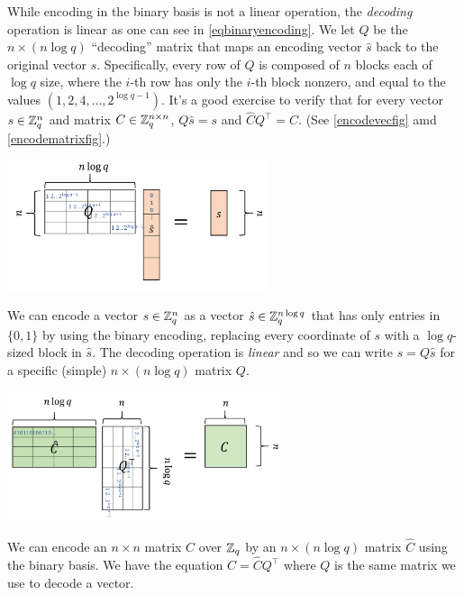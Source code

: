 While encoding in the binary basis is not a linear operation, the
\emph{decoding} operation is linear as one can see in
\eqref{eqbinaryencoding}. We let \(Q\) be the \(n \times (n\log q)\)
``decoding'' matrix that maps an encoding vector \(\hat{s}\) back to the
original vector \(s\). Specifically, every row of \(Q\) is composed of
\(n\) blocks each of \(\log q\) size, where the \(i\)-th row has only
the \(i\)-th block nonzero, and equal to the values
\((1,2,4,\ldots,2^{\log q-1})\). It's a good exercise to verify that for
every vector \(s\in {\mathbb{Z}}_q^n\) and matrix \(C\in {\mathbb{Z}}_q^{n\times n}\),
\(Q\hat{s}=s\) and \(\hat{C}Q^\top =C\). (See \cref{encodevecfig} amd
\cref{encodematrixfig}.)

\begin{marginfigure}
\centering
\includegraphics[width=\linewidth, height=1.5in, keepaspectratio]{../figure/encodevec.png}
\caption{We can encode a vector \(s\in {\mathbb{Z}}_q^n\) as a vector
\(\hat{s} \in {\mathbb{Z}}_q^{n\log q}\) that has only entries in \(\{0,1\}\) by
using the binary encoding, replacing every coordinate of \(s\) with a
\(\log q\)-sized block in \(\hat{s}\). The decoding operation is
\emph{linear} and so we can write \(s=Q\hat{s}\) for a specific (simple)
\(n \times (n\log q)\) matrix \(Q\).}
\label{encodevecfig}
\end{marginfigure}

\begin{marginfigure}
\centering
\includegraphics[width=\linewidth, height=1.5in, keepaspectratio]{../figure/encodematrix.png}
\caption{We can encode an \(n\times n\) matrix \(C\) over \({\mathbb{Z}}_q\) by an
\(n\times (n \log q)\) matrix \(\hat{C}\) using the binary basis. We
have the equation \(C=\hat{C}Q^\top\) where \(Q\) is the same matrix we
use to decode a vector.}
\label{encodematrixfig}
\end{marginfigure}

